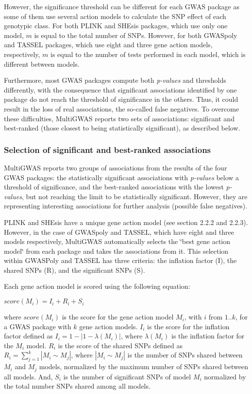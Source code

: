 \documentclass{article}
\begin{document}
However, the significance threshold can be different for each GWAS package as some of them use several action models to calculate the SNP effect of each genotypic class. For both PLINK and SHEsis packages, which use only one model, $m$ is equal to the total number of SNPs. However, for both GWASpoly and TASSEL packages, which use eight and three gene action models, respectively, $m$ is equal to the number of tests performed in each model, which is different between models.

Furthermore, most GWAS packages compute both \emph{p-values} and thresholds differently, with the consequence that significant associations identified by one package do not reach the threshold of significance in the others. Thus, it could result in the loss of real associations, the so-called false negatives. To overcome these difficulties, MultiGWAS reports two sets of associations: significant and best-ranked (those closest to being statistically significant), as described below.

\subsubsection{Selection of significant and best-ranked associations}

MultiGWAS reports two groups of associations from the results of the four GWAS packages: the statistically significant associations with \emph{p-values} below a threshold of significance, and the best-ranked associations with the lowest \emph{p-values}, but not reaching the limit to be statistically significant. However, they are representing interesting associations for further analysis (possible false negatives).

PLINK and SHEsis have a unique gene action model (see section 2.2.2 and 2.2.3). However, in the case of GWASpoly and TASSEL, which have eight and three models respectively, MultiGWAS automatically selects the \char`\"{}best gene action model\char`\"{} from each package and takes the associations from it. This selection within GWASPoly and TASSEL has three criteria: the inflation factor (I), the shared SNPs (R), and the significant SNPs (S).

Each gene action model is scored using the following equation: 
\begin{center}
$score(M_{i})=I{}_{i}+R_{i}+S{}_{i}$
\par\end{center}

where $score(M_{i})$ is the score for the gene action model $M_{i}$, with $i$ from $1..k$, for a GWAS package with $k$ gene action models. $I_{i}$ is the score for the inflation factor defined as $I_{i}=1-|1-\lambda(M_{i})|$, where $\lambda(M_{i})$ is the inflation factor for the $M_{i}$ model. $R_{i}$ is the score of the shared SNPs defined as $R_{i}=\sum\limits _{j=1}^{k}{\textstyle |M_{i}\sim M_{j}|}$, where ${\textstyle |M_{i}\sim M_{j}|}$ is the number of SNPs shared between $M_{i}$ and $M_{j}$ models, normalized by the maximum number of SNPs shared between all models. And, $S_{i}$ is the number of significant SNPs of model $M_{i}$ normalized by the total number SNPs shared among all models.
\end{document}
